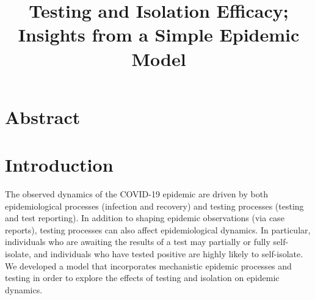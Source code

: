 \documentclass[12pt]{article}
\title{Testing and Isolation Efficacy; Insights from a Simple Epidemic Model }
\theoremstyle{definition} %
\begin{document}
\maketitle

\section{Abstract}

\section{Introduction}

The observed dynamics of the COVID-19 epidemic are driven by both epidemiological processes (infection and recovery) and testing processes (testing and test reporting). In addition to shaping epidemic observations (via case reports), testing processes can also affect epidemiological dynamics. In particular, individuals who are awaiting the results of a test may partially or fully self-isolate, and individuals who have tested positive are highly likely to self-isolate. We developed a model that incorporates mechanistic epidemic processes and testing in order to explore the effects of testing and isolation on epidemic dynamics.
\end{document}
